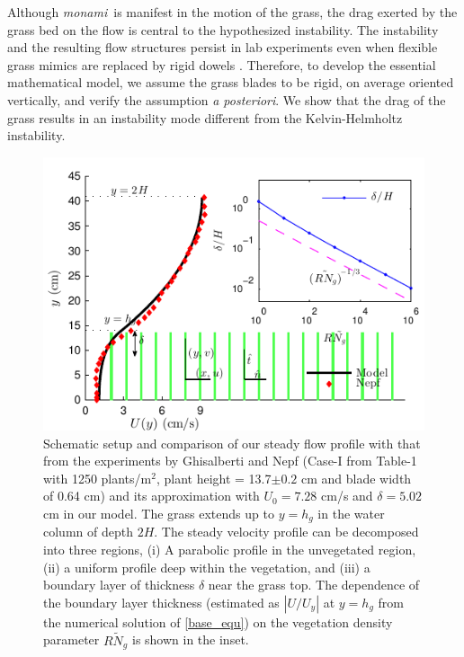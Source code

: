 \documentclass[aps,preprint,12pt]{revtex4-1}  %
\newcommand{\hg}{h_g}
\newcommand{\Rey}{{R}}
\newcommand{\Ndg}{\tilde{N}_g}
\newcommand{\monami}{\textit{monami}}
\begin{document}
Although \monami ~is manifest in the motion of the grass, the drag exerted by the grass bed on the flow is central to the hypothesized instability. 
The instability and the resulting flow structures persist in lab experiments even when flexible grass mimics are replaced by rigid dowels \cite{Ghisal02,Nepf06}. 
Therefore, to develop the essential mathematical model, we assume the grass blades to be rigid, on average oriented vertically, and verify the assumption \textit{a posteriori}.
We show that the drag of the grass results in an instability mode different from the Kelvin-Helmholtz instability.
\begin{figure}
\includegraphics[scale=1]{Grass_Base_Nepf_shear}
\caption{Schematic setup and comparison of our steady flow profile with that from the experiments by Ghisalberti and Nepf \cite{Nepf04} (Case-I from Table-1 with 1250 plants/m$^2$, 
plant height = 13.7$\pm 0.2$ cm and blade width of 0.64 cm)
 and its approximation with $U_0=7.28$ cm/s and $\delta = 5.02$ cm in our model. The grass extends up to $y=h_g$ in the water column of depth $2H$. 
The steady velocity profile can be decomposed into three regions, (i) A parabolic profile in the unvegetated region, (ii) a uniform profile deep within the vegetation, and (iii) a boundary layer of thickness $\delta$ near the grass top. 
The dependence of the boundary layer thickness (estimated as $|U/U_y|$ at $y=\hg$ from the numerical solution of \eqref{base_equ}) on the vegetation density parameter $\Rey \Ndg$ is shown in the inset.}
\label{basicflow}
\end{figure}
\end{document}
